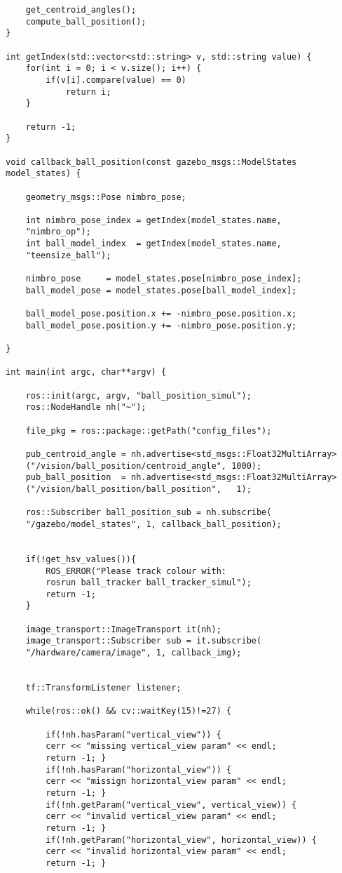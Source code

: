 \begin{lstlisting}
    get_centroid_angles();
    compute_ball_position();
}

int getIndex(std::vector<std::string> v, std::string value) {
    for(int i = 0; i < v.size(); i++) {
        if(v[i].compare(value) == 0)
            return i;
    }

    return -1;
}

void callback_ball_position(const gazebo_msgs::ModelStates 
model_states) {

    geometry_msgs::Pose nimbro_pose;

    int nimbro_pose_index = getIndex(model_states.name, 
    "nimbro_op");
    int ball_model_index  = getIndex(model_states.name, 
    "teensize_ball");

    nimbro_pose     = model_states.pose[nimbro_pose_index];
    ball_model_pose = model_states.pose[ball_model_index];

    ball_model_pose.position.x += -nimbro_pose.position.x;
    ball_model_pose.position.y += -nimbro_pose.position.y;

}

int main(int argc, char**argv) {

    ros::init(argc, argv, "ball_position_simul");
    ros::NodeHandle nh("~");
    
    file_pkg = ros::package::getPath("config_files");

    pub_centroid_angle = nh.advertise<std_msgs::Float32MultiArray>
    ("/vision/ball_position/centroid_angle", 1000);
    pub_ball_position  = nh.advertise<std_msgs::Float32MultiArray>
    ("/vision/ball_position/ball_position",   1);

    ros::Subscriber ball_position_sub = nh.subscribe(
    "/gazebo/model_states", 1, callback_ball_position);
    

    if(!get_hsv_values()){
        ROS_ERROR("Please track colour with: 
        rosrun ball_tracker ball_tracker_simul");
        return -1;
    }        
    
    image_transport::ImageTransport it(nh);
    image_transport::Subscriber sub = it.subscribe(
    "/hardware/camera/image", 1, callback_img); 


    tf::TransformListener listener;

    while(ros::ok() && cv::waitKey(15)!=27) {

        if(!nh.hasParam("vertical_view")) { 
        cerr << "missing vertical_view param" << endl; 
        return -1; }
        if(!nh.hasParam("horizontal_view")) { 
        cerr << "missign horizontal_view param" << endl; 
        return -1; }
        if(!nh.getParam("vertical_view", vertical_view)) { 
        cerr << "invalid vertical_view param" << endl; 
        return -1; }
        if(!nh.getParam("horizontal_view", horizontal_view)) { 
        cerr << "invalid horizontal_view param" << endl; 
        return -1; }


\end{lstlisting}
